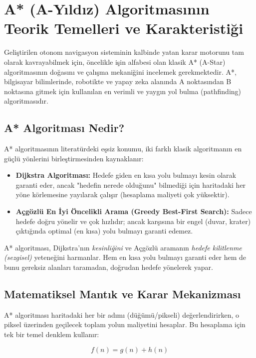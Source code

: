 \documentclass[12pt,a4paper]{article}
\begin{document}
\section{A* (A-Yıldız) Algoritmasının Teorik Temelleri ve Karakteristiği}
Geliştirilen otonom navigasyon sisteminin kalbinde yatan karar motorunu tam olarak kavrayabilmek için, öncelikle işin alfabesi olan klasik A* (A-Star) algoritmasının doğasını ve çalışma mekaniğini incelemek gerekmektedir. A*, bilgisayar bilimlerinde, robotikte ve yapay zeka alanında A noktasından B noktasına gitmek için kullanılan en verimli ve yaygın yol bulma (pathfinding) algoritmasıdır.

\subsection{A* Algoritması Nedir?}
A* algoritmasının literatürdeki eşsiz konumu, iki farklı klasik algoritmanın en güçlü yönlerini birleştirmesinden kaynaklanır:
\begin{itemize}
    \item \textbf{Dijkstra Algoritması:} Hedefe giden en kısa yolu bulmayı kesin olarak garanti eder, ancak "hedefin nerede olduğunu" bilmediği için haritadaki her yöne körlemesine yayılarak çalışır (hesaplama maliyeti çok yüksektir).
    \item \textbf{Açgözlü En İyi Öncelikli Arama (Greedy Best-First Search):} Sadece hedefe doğru yönelir ve çok hızlıdır; ancak karşısına bir engel (duvar, krater) çıktığında optimal (en kısa) yolu bulmayı garanti edemez.
\end{itemize}
A* algoritması, Dijkstra'nın \textit{kesinliğini} ve Açgözlü aramanın \textit{hedefe kilitlenme (sezgisel)} yeteneğini harmanlar. Hem en kısa yolu bulmayı garanti eder hem de bunu gereksiz alanları taramadan, doğrudan hedefe yönelerek yapar.

\subsection{Matematiksel Mantık ve Karar Mekanizması}
A* algoritması haritadaki her bir adımı (düğümü/pikseli) değerlendirirken, o piksel üzerinden geçilecek toplam yolun maliyetini hesaplar. Bu hesaplama için tek bir temel denklem kullanır:

\begin{equation}
f(n) = g(n) + h(n)
\end{equation}
\end{document}
